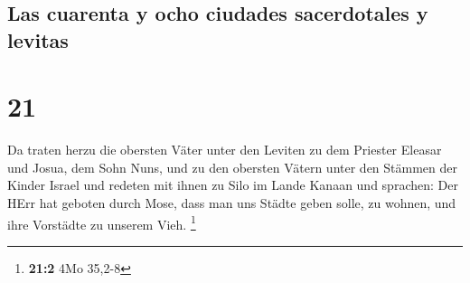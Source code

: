 \hypertarget{las-cuarenta-y-ocho-ciudades-sacerdotales-y-levitas}{%
\subsection{Las cuarenta y ocho ciudades sacerdotales y
levitas}\label{las-cuarenta-y-ocho-ciudades-sacerdotales-y-levitas}}

\hypertarget{section-20}{%
\section{21}\label{section-20}}

 Da traten herzu die obersten Väter unter den Leviten zu
dem Priester Eleasar und Josua, dem Sohn Nuns, und zu den obersten
Vätern unter den Stämmen der Kinder Israel  und redeten
mit ihnen zu Silo im Lande Kanaan und sprachen: Der HErr hat geboten
durch Mose, dass man uns Städte geben solle, zu wohnen, und ihre
Vorstädte zu unserem Vieh. \footnote{\textbf{21:2} 4Mo 35,2-8}

